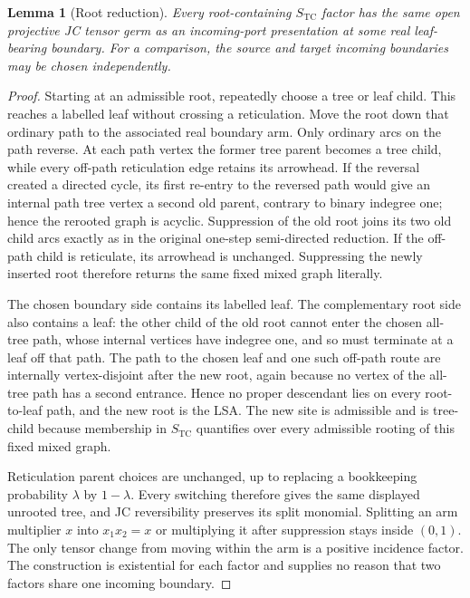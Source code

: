 \documentclass[11pt]{article}
\newtheorem{lemma}[theorem]{Lemma}
\theoremstyle{remark}
\newcommand{\TCs}{S_{\mathrm{TC}}}
\begin{document}
\begin{lemma}[Root reduction]\label{lem:root}
Every root-containing $\TCs$ factor has the same open projective JC tensor
germ as an incoming-port presentation at some real leaf-bearing boundary.
For a comparison, the source and target incoming boundaries may be chosen
independently.
\end{lemma}

\begin{proof}
Starting at an admissible root, repeatedly choose a tree or leaf child.  This
reaches a labelled leaf without crossing a reticulation.  Move the root down
that ordinary path to the associated real boundary arm.  Only ordinary arcs
on the path reverse.  At each path vertex the former tree parent becomes a
tree child, while every off-path reticulation edge retains its arrowhead.  If
the reversal created a directed cycle, its first re-entry to the reversed
path would give an internal path tree vertex a second old parent, contrary to
binary indegree one; hence the rerooted graph is acyclic.  Suppression of the
old root joins its two old child arcs exactly as in the original one-step
semi-directed reduction.  If the off-path child is reticulate, its arrowhead
is unchanged.  Suppressing the newly inserted root therefore returns the
same fixed mixed graph literally.

The chosen boundary side contains its labelled leaf.  The complementary
root side also contains a leaf: the other child of the old root cannot enter
the chosen all-tree path, whose internal vertices have indegree one, and so
must terminate at a leaf off that path.  The path to the chosen leaf and one
such off-path route are internally vertex-disjoint after the new root, again
because no vertex of the all-tree path has a second entrance.  Hence no
proper descendant lies on every root-to-leaf path, and the new root is the
LSA.  The new site is admissible and is tree-child because membership in
$\TCs$ quantifies over every admissible rooting of this fixed mixed graph.

Reticulation parent choices are unchanged, up to replacing a bookkeeping
probability $\lambda$ by $1-\lambda$.  Every switching therefore gives the
same displayed unrooted tree, and JC reversibility preserves its split
monomial.  Splitting an arm multiplier $x$ into $x_1x_2=x$ or multiplying it
after suppression stays inside $(0,1)$.  The only tensor change from moving
within the arm is a positive incidence factor.  The construction is
existential for each factor and supplies no reason that two factors share one
incoming boundary.
\end{proof}
\end{document}
